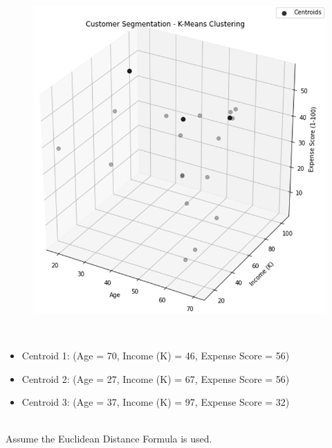 \documentclass{book}
\begin{document}
\newpage
\begin{figure}
    \centering
    \includegraphics[scale=0.2]{chapter 5/ch5_figure4.jpeg}
\end{figure}
\\
\begin{itemize}
    \item Centroid 1: (Age = 70, Income (K) = 46, Expense Score = 56)
    \item Centroid 2: (Age = 27, Income (K) = 67, Expense Score = 56)
    \item Centroid 3: (Age = 37, Income (K) = 97, Expense Score = 32)
\end{itemize}
\vspace{2cm}
\\
Assume the Euclidean Distance Formula is used.
\end{document}
